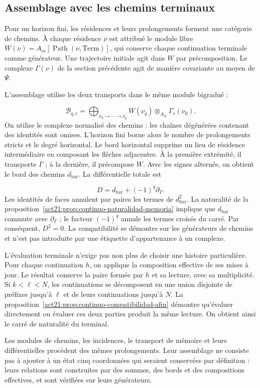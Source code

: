 \subsection{Assemblage avec les chemins terminaux}
Pour un horizon fini, les résidences et leurs prolongements forment une catégorie de chemins. À chaque résidence \(\nu\) est attribué le module libre \(W(\nu)=A_m[\operatorname{Path}(\nu,\mathrm{Term})]\), qui conserve chaque continuation terminale comme générateur. Une trajectoire initiale agit dans \(W\) par précomposition. Le complexe \(\Gamma(\nu)\) de la section précédente agit de manière covariante au moyen de \(\Psi\).

L'assemblage utilise les deux transports dans le même module bigradué :

\[
\mathcal B_{q,r}=
\bigoplus_{\nu_0\to\cdots\to\nu_q}
W(\nu_q)\otimes_{A_m}\Gamma_r(\nu_0).
\]
On utilise le complexe normalisé des chemins : les chaînes dégénérées contenant des identités sont omises. L'horizon fini borne alors le nombre de prolongements stricts et le degré horizontal. Le bord horizontal supprime un lieu de résidence intermédiaire en composant les flèches adjacentes. À la première extrémité, il transporte \(\Gamma\) ; à la dernière, il précompose \(W\). Avec les signes alternés, on obtient le bord des chemins \(d_{\mathrm{bar}}\). La différentielle totale est

\[
D=d_{\mathrm{bar}}+(-1)^q\partial_\Gamma.
\]
Les identités de faces annulent par paires les termes de \(d_{\mathrm{bar}}^2\). La naturalité de la proposition~\ref{act21:prop:continuo-naturalidad-memoria} implique que \(d_{\mathrm{bar}}\) commute avec \(\partial_\Gamma\) ; le facteur \((-1)^q\) annule les termes croisés du carré. Par conséquent, \(D^2=0\). La compatibilité se démontre sur les générateurs de chemins et n'est pas introduite par une étiquette d'appartenance à un complexe.

L'évaluation terminale n'exige pas non plus de choisir une histoire particulière. Pour chaque continuation \(h\), on applique la composition effective de ses mises à jour. Le résultat conserve la paire formée par \(h\) et sa lecture, avec sa multiplicité. Si \(k<\ell<N\), les continuations se décomposent en une union disjointe de préfixes jusqu'à \(\ell\) et de leurs continuations jusqu'à \(N\). La proposition~\ref{act21:prop:continuo-compatibilidad-afin} démontre qu'évaluer directement ou évaluer ces deux parties produit la même lecture. On obtient ainsi le carré de naturalité du terminal.

Les modules de chemins, les incidences, le transport de mémoire et leurs différentielles procèdent des mêmes prolongements. Leur assemblage ne consiste pas à ajouter à un état cinq coordonnées qui seraient conservées par définition : leurs relations sont construites par des sommes, des bords et des compositions effectives, et sont vérifiées sur leurs générateurs.

